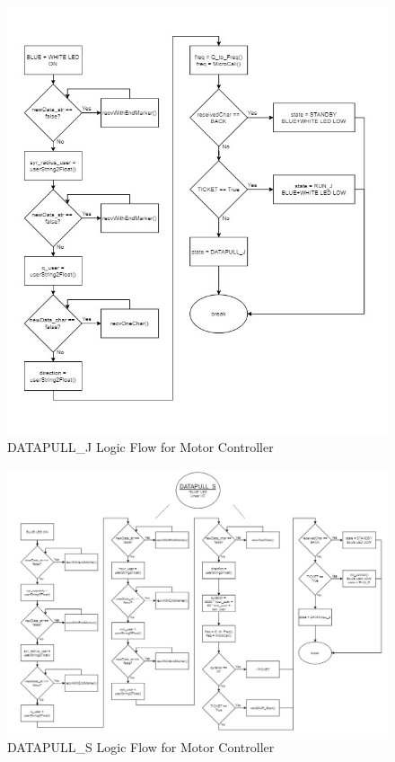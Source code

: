 \documentclass[journal]{IEEEtran}
\begin{document}
        \begin{figure}[H]
            \centering
            \includegraphics[scale = 1, angle=90]{Images/DATAPULL_J_ver1.jpg}
            \caption{DATAPULL\_J Logic Flow for Motor Controller}
            \label{fig:DATAPULLJ_mc}
        \end{figure}
        
        \newpage
        \quad
        \newpage
        
        \begin{figure}[H]
            \centering
            \includegraphics[scale = 0.75, angle=90]{Images/DATAPULL_S_ver1.jpg}
            \caption{DATAPULL\_S Logic Flow for Motor Controller}
            \label{fig:DATAPULLS_mc}
        \end{figure}
        
\end{document}
